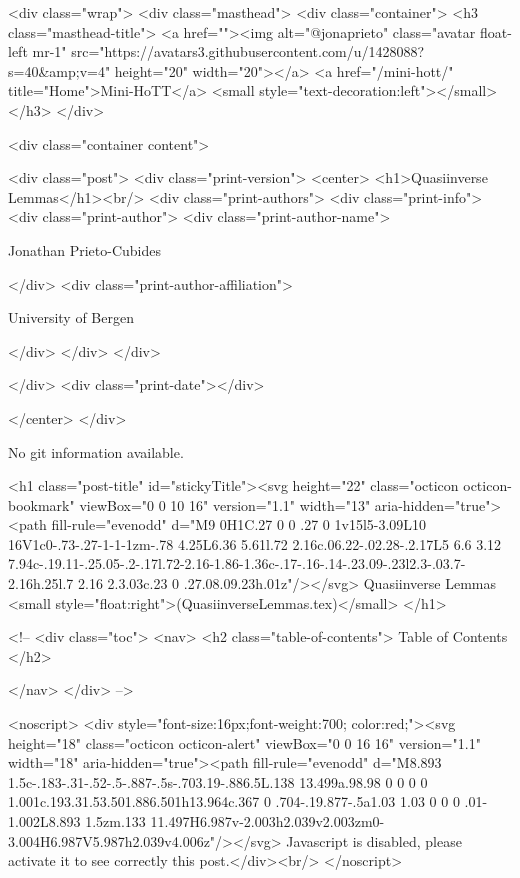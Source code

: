     <div class="wrap">
      <div class="masthead">
        <div class="container">
          <h3 class="masthead-title">
            <a href=""><img alt="@jonaprieto" class="avatar float-left mr-1" src="https://avatars3.githubusercontent.com/u/1428088?s=40&amp;v=4" height="20" width="20"></a>
            <a href="/mini-hott/" title="Home">Mini-HoTT</a>
            <small style="text-decoration:left"></small>
          </h3>
        </div>
      
      <div class="container content">
        







<div class="post">
  <div class="print-version">
    <center>
      <h1>Quasiinverse Lemmas</h1><br/>
        <div class="print-authors">
          <div class="print-info">
            <div class="print-author">
              <div class="print-author-name">
                
                  Jonathan Prieto-Cubides
                
              </div>
              <div class="print-author-affiliation">
                
                  University of Bergen
                
                </div>
            </div>
          </div>
          
          
        </div>
        <div class="print-date"></div>
        
        
    </center>
  </div>

  
  No git information available.
  

  <h1 class="post-title" id="stickyTitle"><svg height="22" class="octicon octicon-bookmark" viewBox="0 0 10 16" version="1.1" width="13" aria-hidden="true"><path fill-rule="evenodd" d="M9 0H1C.27 0 0 .27 0 1v15l5-3.09L10 16V1c0-.73-.27-1-1-1zm-.78 4.25L6.36 5.61l.72 2.16c.06.22-.02.28-.2.17L5 6.6 3.12 7.94c-.19.11-.25.05-.2-.17l.72-2.16-1.86-1.36c-.17-.16-.14-.23.09-.23l2.3-.03.7-2.16h.25l.7 2.16 2.3.03c.23 0 .27.08.09.23h.01z"/></svg> Quasiinverse Lemmas <small style="float:right">(QuasiinverseLemmas.tex)</small>
  </h1>

  <!-- 
  <div class="toc">
    <nav>
    <h2 class="table-of-contents"> Table of Contents </h2>
      

    </nav>
  </div>
   -->

  <noscript>
  <div style="font-size:16px;font-weight:700; color:red;"><svg height="18" class="octicon octicon-alert" viewBox="0 0 16 16" version="1.1" width="18" aria-hidden="true"><path fill-rule="evenodd" d="M8.893 1.5c-.183-.31-.52-.5-.887-.5s-.703.19-.886.5L.138 13.499a.98.98 0 0 0 0 1.001c.193.31.53.501.886.501h13.964c.367 0 .704-.19.877-.5a1.03 1.03 0 0 0 .01-1.002L8.893 1.5zm.133 11.497H6.987v-2.003h2.039v2.003zm0-3.004H6.987V5.987h2.039v4.006z"/></svg> Javascript is disabled, please activate it to see correctly this post.</div><br/>
  </noscript>

